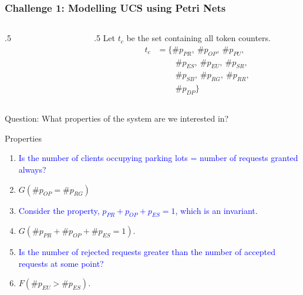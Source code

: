 \documentclass [serif,professionalfont]{beamer}
\begin{document}
\begin{frame}\frametitle{Challenge 1: Modelling UCS \colorbox{green!30}{using Petri Nets}}

    \begin{columns}[T] %
        \begin{column}{.5\textwidth}
            \begin{figure}
                \begin{center}
                    \scalebox{0.8}{}
                \end{center}
            \end{figure}
        \end{column}
        \hfill
        \begin{column}{.5\textwidth}
            Let $t_c$ be the set containing all token counters.
            \small{
                \begin{align*}
                    t_c
                     & =\{\#p_{PR}, ~\#p_{OP},~\#p_{PU},      \\
                     & \qquad~\#p_{ES},~\#p_{EU},~ \#p_{SR},  \\
                     & \qquad~\#p_{SB}, ~\#p_{RG},~ \#p_{RR}, \\
                     & \qquad~\#p_{DP}\}
                \end{align*}
            }
        \end{column}%
    \end{columns}
\end{frame}


\begin{frame}{}
    \centering
    \huge{Question: What properties of the system are we interested in?}
\end{frame}



\begin{frame}{Properties }
    \begin{enumerate}

        \item \textcolor{blue}{Is the number of clients occupying parking lots = number of requests granted always?}
        \item[] $ G (\#p_{OP}= \#p_{RG})$
            \pause

        \item \textcolor{blue}{Consider the property, $p_{PR}+p_{OP}+p_{ES} = 1$, which is an invariant.}

        \item[] $G(\#p_{PR} + \#p_{OP} + \#p_{ES} =1)$.
            \pause
        \item \textcolor{blue}{Is the number of rejected requests greater than the number of accepted requests at some point?}


        \item[]
            $F(\#p_{EU} > \#p_{ES})$.
    \end{enumerate}
\end{frame}
\end{document}
